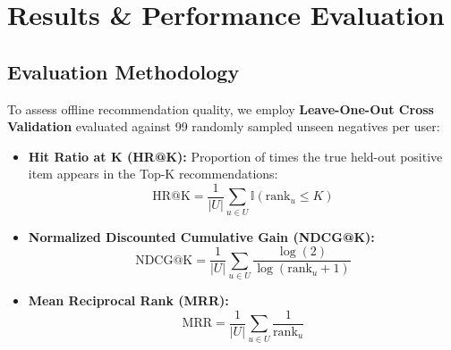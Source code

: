 \documentclass[12pt,a4paper,oneside]{report}
\begin{document}
\chapter{Results \& Performance Evaluation}

\section{Evaluation Methodology}
To assess offline recommendation quality, we employ \textbf{Leave-One-Out Cross Validation} evaluated against 99 randomly sampled unseen negatives per user:
\begin{itemize}
    \item \textbf{Hit Ratio at K (HR@K):} Proportion of times the true held-out positive item appears in the Top-K recommendations:
    \begin{equation}
        \text{HR@K} = \frac{1}{|U|} \sum_{u \in U} \mathbb{I}(\text{rank}_{u} \le K)
    \end{equation}
    \item \textbf{Normalized Discounted Cumulative Gain (NDCG@K):}
    \begin{equation}
        \text{NDCG@K} = \frac{1}{|U|} \sum_{u \in U} \frac{\log(2)}{\log(\text{rank}_u + 1)}
    \end{equation}
    \item \textbf{Mean Reciprocal Rank (MRR):}
    \begin{equation}
        \text{MRR} = \frac{1}{|U|} \sum_{u \in U} \frac{1}{\text{rank}_u}
    \end{equation}
\end{itemize}
\end{document}
